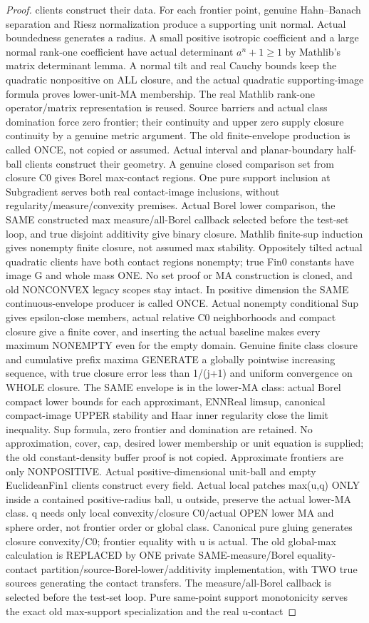 \begin{proof}
  clients construct their data. For each frontier point, genuine Hahn--Banach separation and Riesz normalization produce a supporting unit normal. Actual boundedness generates a radius. A small positive isotropic coefficient and a large normal rank-one coefficient have actual determinant $a^n+1\ge1$ by Mathlib's matrix determinant lemma. A normal tilt and real Cauchy bounds keep the quadratic nonpositive on ALL closure, and the actual quadratic supporting-image formula proves lower-unit-MA membership. The real Mathlib rank-one operator/matrix representation is reused. Source barriers and actual class domination force zero frontier; their continuity and upper zero supply closure continuity by a genuine metric argument. The old finite-envelope production is called ONCE, not copied or assumed. Actual interval and planar-boundary half-ball clients construct their geometry. A genuine closed comparison set from closure C0 gives Borel max-contact regions. One pure support inclusion at Subgradient serves both real contact-image inclusions, without regularity/measure/convexity premises. Actual Borel lower comparison, the SAME constructed max measure/all-Borel callback selected before the test-set loop, and true disjoint additivity give binary closure. Mathlib finite-sup induction gives nonempty finite closure, not assumed max stability. Oppositely tilted actual quadratic clients have both contact regions nonempty; true Fin0 constants have image G and whole mass ONE. No set proof or MA construction is cloned, and old NONCONVEX legacy scopes stay intact. In positive dimension the SAME continuous-envelope producer is called ONCE. Actual nonempty conditional Sup gives epsilon-close members, actual relative C0 neighborhoods and compact closure give a finite cover, and inserting the actual baseline makes every maximum NONEMPTY even for the empty domain. Genuine finite class closure and cumulative prefix maxima GENERATE a globally pointwise increasing sequence, with true closure error less than 1/(j+1) and uniform convergence on WHOLE closure. The SAME envelope is in the lower-MA class: actual Borel compact lower bounds for each approximant, ENNReal limsup, canonical compact-image UPPER stability and Haar inner regularity close the limit inequality. Sup formula, zero frontier and domination are retained. No approximation, cover, cap, desired lower membership or unit equation is supplied; the old constant-density buffer proof is not copied. Approximate frontiers are only NONPOSITIVE. Actual positive-dimensional unit-ball and empty EuclideanFin1 clients construct every field. Actual local patches max(u,q) ONLY inside a contained positive-radius ball, u outside, preserve the actual lower-MA class. q needs only local convexity/closure C0/actual OPEN lower MA and sphere order, not frontier order or global class. Canonical pure gluing generates closure convexity/C0; frontier equality with u is actual. The old global-max calculation is REPLACED by ONE private SAME-measure/Borel equality-contact partition/source-Borel-lower/additivity implementation, with TWO true sources generating the contact transfers. The measure/all-Borel callback is selected before the test-set loop. Pure same-point support monotonicity serves the exact old max-support specialization and the real u-contact 
\end{proof}

